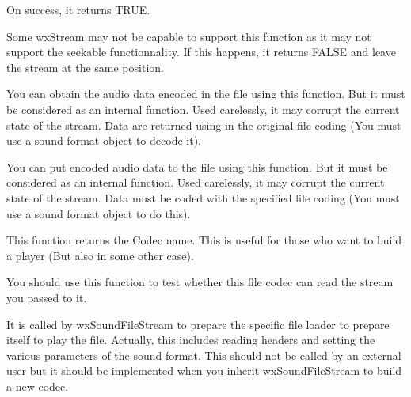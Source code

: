 On success, it returns TRUE.


Some wxStream may not be capable to support this function as
it may not support the seekable functionnality. If this happens,
it returns FALSE and leave the stream at the same position.

\label{wxsoundfilestreamread}

You can obtain the audio data encoded in the file using this function.
But it must be considered as an internal function. Used carelessly, it
may corrupt the current state of the stream.
Data are returned using in the original file coding (You must use a sound
format object to decode it).

\label{wxsoundfilestreamwrite}

You can put encoded audio data to the file using this function.
But it must be considered as an internal function. Used carelessly, it
may corrupt the current state of the stream.
Data must be coded with the specified file coding (You must use a sound
format object to do this).

\label{wxsoundfilestreamsetsoundformat}

\label{wxsoundfilestreamgetcodecname}

This function returns the Codec name. This is useful for those who
want to build a player (But also in some other case).

\label{wxsoundfilestreamcanread}

You should use this function to test whether this file codec can read
the stream you passed to it.

\label{wxsoundfilestreampreparetoplay}

It is called by wxSoundFileStream to prepare the specific file loader
to prepare itself to play the file. Actually, this includes reading
headers and setting the various parameters of the sound format.
This should not be called by an external user but it should be
implemented when you inherit wxSoundFileStream to build a new codec.


